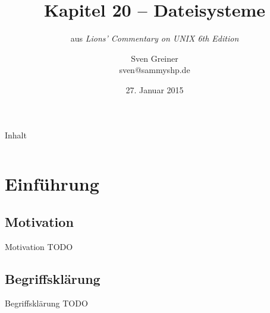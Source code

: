 \documentclass{beamer}
\title{Kapitel 20 -- Dateisysteme}
\subtitle{aus \emph{Lions' Commentary on UNIX 6th Edition}}
\author{Sven Greiner\\\footnotesize\ttfamily sven@sammyshp.de}
\date{27. Januar 2015}
\begin{document}


\begin{frame}[plain]
    \titlepage
\end{frame}




\begin{frame}[plain]{Inhalt}
    \label{TableOfContents}
    \vfill
    \begin{columns}[t]
        \begin{column}{.5\textwidth}
            \tableofcontents[sections={1}]
        \end{column}
        \begin{column}{.5\textwidth}
            \tableofcontents[sections={2}]
        \end{column}
    \end{columns}
    \vfill
\end{frame}




\section{Einführung}

\begin{frame}[plain]
    \sectionpage
\end{frame}




\subsection{Motivation}

\begin{frame}{Motivation}
    TODO
\end{frame}




\subsection{Begriffsklärung}

\begin{frame}{Begriffsklärung}
    TODO
\end{frame}
\end{document}
